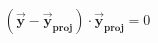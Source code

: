 \documentclass[preview]{standalone}
\begin{document}
\begin{align*}
(\mathbf{\vec{y}} - \mathbf{\vec{y}}_{\textbf{proj}}) \cdot \mathbf{\vec{y}}_{\textbf{proj}} = 0
\end{align*}
\end{document}

